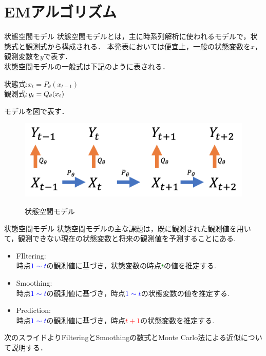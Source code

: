 \documentclass[dvipdfmx]{beamer}
\begin{document}
\section{EMアルゴリズム}

\begin{frame}{状態空間モデル}
状態空間モデルとは，主に時系列解析に使われるモデルで，状態式と観測式から構成される．
本発表においては便宜上，一般の状態変数を$x$，観測変数を$y$で表す．\\
状態空間モデルの一般式は下記のように表される．\\
\begin{center}
状態式:$x_t = P_{\theta}(x_{t-1})$\\
観測式:$y_t = Q_{\theta}(x_{t})\hspace{3.5mm}$
\end{center}
モデルを図で表す．
\begin{figure}[h]
\begin{center}
  \includegraphics[scale=0.41]{figure/state_space.png} \\
\label{fig:state_space}
\end{center}
\caption{状態空間モデル}
\end{figure}
\end{frame}


\begin{frame}{状態空間モデル}
状態空間モデルの主な課題は，既に観測された観測値を用いて，観測できない現在の状態変数と将来の観測値を予測することにある.\\
\begin{itemize}
 \item FIltering:\\
 時点\textcolor{blue}{$1\sim t$}の観測値に基づき，状態変数の時点\textcolor{green}{$t$}の値を推定する.
 \item Smoothing:\\
 時点\textcolor{blue}{$1\sim t$}の観測値に基づき，時点\textcolor{blue}{$1\sim t$}の状態変数の値を推定する.
 \item Prediction:\\
 時点\textcolor{blue}{$1\sim t$}の観測値に基づき，時点\textcolor{red}{$t+1$}の状態変数を推定する.
\end{itemize}
次のスライドよりFilteringとSmoothingの数式とMonte Carlo法による近似について説明する．
\end{frame}
\end{document}
